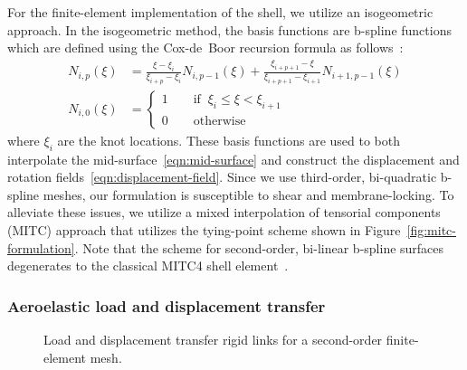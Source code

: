 \documentclass[]{aiaa-tc}
\newcommand{\f}{\frac}
\begin{document}
For the finite-element implementation of the shell, we utilize an
isogeometric approach. In the isogeometric method, the basis functions
are b-spline functions which are defined using the Cox-de~Boor
recursion formula as follows~\cite{NURBSbook}:
%
\begin{equation}
  \label{eqn:b-spline-basis}
  \begin{aligned}
    N_{i,p}(\xi) & = \f{\xi - \xi_{i}}{\xi_{i+p} - \xi_{i}} N_{i,p-1}(\xi) + \f{\xi_{i+p+1} - \xi}{\xi_{i+p+1} - \xi_{i+1}}N_{i+1,p-1}(\xi) \\
    N_{i,0}(\xi) & = \left\{ 
      \begin{array}{l} 
        1 \qquad \text{if}\;\; \xi_{i} \le \xi < \xi_{i+1} \\
        0 \qquad \text{otherwise}
      \end{array} \right.
  \end{aligned}
\end{equation}
where $\xi_{i}$ are the knot locations.  These basis functions are
used to both interpolate the mid-surface~\eqref{eqn:mid-surface} and
construct the displacement and rotation
fields~\eqref{eqn:displacement-field}. Since we use third-order,
bi-quadratic b-spline meshes, our formulation is susceptible to shear
and membrane-locking. To alleviate these issues, we utilize a mixed
interpolation of tensorial components (MITC) approach that utilizes
the tying-point scheme shown in Figure~\ref{fig:mitc-formulation}.
Note that the scheme for second-order, bi-linear b-spline surfaces
degenerates to the classical MITC4 shell
element~\cite{Dvorkin:1984:CMB}.

\subsubsection{Aeroelastic load and displacement transfer}

\begin{figure}
  \centering
  \caption{Load and displacement transfer rigid links for a
    second-order finite-element mesh.}
\end{figure}
\end{document}
